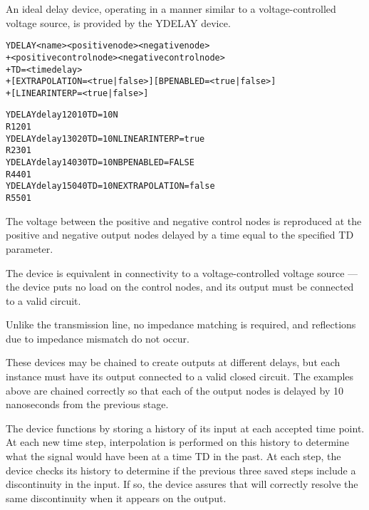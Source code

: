 


An ideal delay device, operating in a manner similar to a
voltage-controlled voltage source, is provided by the YDELAY device.

\begin{Device}

\device
\begin{alltt}
YDELAY <name> <positive node> <negative node>
+ <positive control node> <negative control node>
+ TD=<time delay>
+ [EXTRAPOLATION=<true|false>] [BPENABLED=<true|false>]
+ [LINEARINTERP=<true|false>] 
\end{alltt}

\examples
\begin{alltt}
YDELAY delay1 2 0 1 0 TD=10N
R1 2 0 1
YDELAY delay1 3 0 2 0 TD=10N LINEARINTERP=true
R2 3 0 1
YDELAY delay1 4 0 3 0 TD=10N BPENABLED=FALSE
R4 4 0 1
YDELAY delay1 5 0 4 0 TD=10N EXTRAPOLATION=false
R5 5 0 1
\end{alltt}

\comments

The voltage between the positive and negative control nodes is
reproduced at the positive and negative output nodes delayed by a time
equal to the specified TD parameter.

The device is equivalent in connectivity to a voltage-controlled
voltage source --- the device puts no load on the control nodes, and
its output must be connected to a valid circuit.

Unlike the transmission line, no impedance matching is required, and
reflections due to impedance mismatch do not occur.

These devices may be chained to create outputs at different delays,
but each instance must have its output connected to a valid closed
circuit.  The examples above are chained correctly so that each of the
output nodes is delayed by 10 nanoseconds from the previous stage.

The device functions by storing a history of its input at each
accepted time point.  At each new time step, interpolation is
performed on this history to determine what the signal would have been
at a time TD in the past.  At each step, the device checks its history
to determine if the previous three saved steps include a discontinuity
in the input.  If so, the device assures that \Xyce{} will correctly
resolve the same discontinuity when it appears on the output.


\end{Device}
